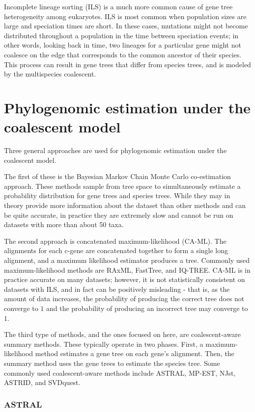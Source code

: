 \documentclass[edeposit,fullpage]{uiucthesis2014}
\theoremstyle{definition}
\begin{document}
Incomplete lineage sorting (ILS) is a much more common cause of gene
tree heterogeneity among eukaryotes. ILS is most common when population sizes are large and speciation times are short. In these cases, mutations might not become distributed throughout a population in the time between speciation events; in other words, looking back in time, two lineages for a particular gene might not coalesce on the edge that corresponds to the common ancestor of their species. This process can result in gene trees that differ from species trees, and is modeled by the multispecies coalescent. 

\section{Phylogenomic estimation under the coalescent model}

Three general approaches are used for phylogenomic estimation under the coalescent model. 

The first of these is the Bayesian Markov Chain Monte Carlo co-estimation approach. These methods sample from tree space to simultaneously estimate a probability distribution for gene trees and species trees. While they may in theory provide more information about the dataset than other methods and can be quite accurate, in practice they are extremely slow and cannot be run on datasets with more than about 50 taxa.

The second approach is concatenated maximum-likelihood (CA-ML). The alignments for each c-gene are concatenated together to form a single long alignment, and a maximum likelihood estimator produces a tree. Commonly used maximum-likelihood methods are RAxML, FastTree, and IQ-TREE. CA-ML is in practice accurate on many datasets; however, it is not statistically consistent on datasets with ILS, and in fact can be positively misleading - that is, as the amount of data increases, the probability of producing the correct tree does not converge to $1$ and the probability of producing an incorrect tree may converge to $1$.

The third type of methods, and the ones focused on here, are coalescent-aware summary methods. These typically operate in two phases. First, a maximum-likelihood method estimates a gene tree on each gene's alignment. Then, the summary method uses the gene trees to estimate the species tree. Some commonly used coalescent-aware methods include ASTRAL, MP-EST, NJst, ASTRID, and SVDquest. 

\subsubsection{ASTRAL}
\end{document}
